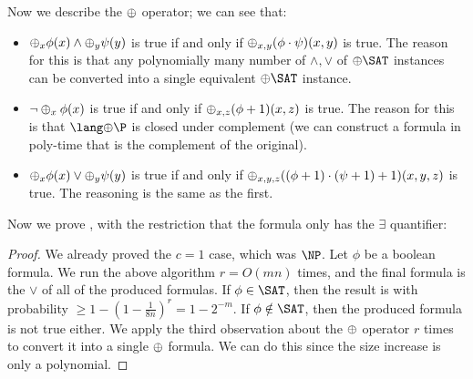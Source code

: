 \par Now we describe the $\oplus$ operator; we can see that:
\begin{itemize}
\item $\oplus_x \phi(x) \wedge \oplus_y \psi(y)$ is true if and only if $\oplus_{x,y}(\phi \cdot \psi)(x, y)$ is true. The reason for this is that any polynomially many number of $\wedge, \vee$ of $\ParitySAT$ instances can be converted into a single equivalent $\ParitySAT$ instance.
\item $\neg \oplus_x \phi(x)$ is true if and only if $\oplus_{x,z}(\phi+1)(x, z)$ is true. The reason for this is that $\ParityP$ is closed under complement (we can construct a formula in poly-time that is the complement of the original).
\item $\oplus_x \phi(x) \vee \oplus_y \psi(y)$ is true if and only if $\oplus_{x,y,z} ((\phi+1)\cdot (\psi+1) + 1)(x,y,z)$ is true. The reasoning is the same as the first.
\end{itemize}

\par Now we prove , with the restriction that the formula only has the $\exists$ quantifier:
\begin{proof}
We already proved the $c=1$ case, which was $\NP$. Let $\phi$ be a boolean formula. We run the above algorithm $r = O(mn)$ times, and the final formula is the $\vee$ of all of the produced formulas. If $\phi \in \SAT$, then the result is with probability $\ge 1-(1-\frac{1}{8n})^r = 1-2^{-m}$. If $\phi \notin \SAT$, then the produced formula is not true either. We apply the third observation about the $\oplus$ operator $r$ times to convert it into a single $\oplus$ formula. We can do this since the size increase is only a polynomial.
\end{proof}

